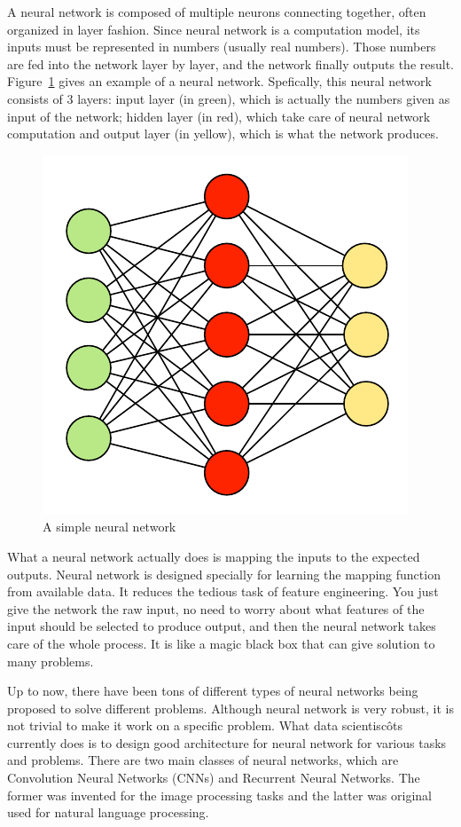 \documentclass[3p, sort&compress, 12pt]{elsarticle}
\begin{document}
\par A neural network is composed of multiple neurons connecting together, often organized in layer fashion. Since neural network is a computation model, its inputs must be represented in numbers (usually real numbers). Those numbers are fed into the network layer by layer, and the network finally outputs the result. Figure~\ref{fig:2:03} gives an example of a neural network. Spefically, this neural network consists of 3 layers: input layer (in green), which is actually the numbers given as input of the network; hidden layer (in red), which take care of neural network computation and output layer (in yellow), which is what the network produces.
\begin{figure}[!htbp]
	\centering
	\includegraphics[scale=1.]{images/PDF/neural-net/neural-net.pdf}
	\caption{A simple neural network}
	\label{fig:2:03}
\end{figure}
\par What a neural network actually does is mapping the inputs to the expected outputs. Neural network is designed specially for learning the mapping function from available data. It reduces the tedious task of feature engineering. You just give the network the raw input, no need to worry about what features of the input should be selected to produce output, and then the neural network takes care of the whole process. It is like a magic black box that can give solution to many problems.
\par Up to now, there have been tons of different types of neural networks being proposed to solve different problems. Although neural network is very robust, it is not trivial to make it work on a specific problem. What data scientiscôts currently does is to design good architecture for neural network for various tasks and problems. There are two main classes of neural networks, which are Convolution Neural Networks (CNNs) and Recurrent Neural Networks. The former was invented for the image processing tasks and the latter was original used for natural language processing.
\end{document}
